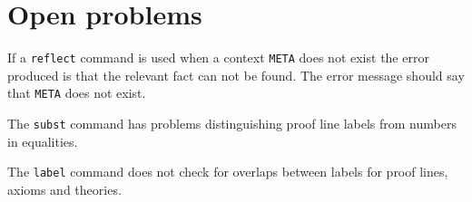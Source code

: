 \section{Open problems}
\label{app-op}

If a {\tt reflect} command is used when a context {\tt META} does not
exist the error produced is that the relevant fact can not be found.
The error message should say that {\tt META} does not exist.

\gap
The {\tt subst} command has problems distinguishing
proof line labels from numbers in equalities.

\gap
The {\tt label} command does not check for overlaps between
labels for proof lines, axioms and theories.

